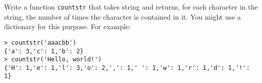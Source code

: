 \documentclass[a4paper, 12pt]{exam}
\begin{document}
\begin{questions}
\begin{solution}
  \inputminted{python}{solutions/sortlist.py}
\end{solution}


\question
Write a function \texttt{countstr} that takes string and returns, for each character in the string, the number of times the character is contained in it.
You might use a dictionary for this purpose.
For example:
\begin{verbatim}
> countstr('aaacbb')
{'a': 3,'c': 1,'b': 2}
> countstr('Hello, world!')
{'H': 1,'e': 1,'l': 3,'o': 2,',': 1,' ': 1,'w': 1,'r': 1,'d': 1,'!': 1}
\end{verbatim}

\begin{solution}
  \inputminted{python}{solutions/countstr.py}
\end{solution}


\end{questions}



\end{document}
